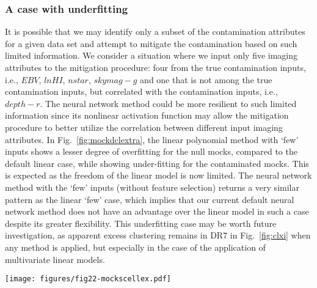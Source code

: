 \subsubsection{A case with underfitting}
It is possible that we may identify only a subset of the contamination attributes for a given data set and attempt to mitigate the contamination based on such limited information. We consider a situation where we input only five imaging attributes to the mitigation procedure: four from the true contamination inputs, i.e., $EBV$, $lnHI$, $nstar$, $skymag-g$ and one that is not among the true contamination inputs, but correlated with the contamination inputs, i.e., $depth-r$. The neural network method could be more resilient to such limited information since its nonlinear activation function may allow the mitigation procedure to better utilize the correlation between different input imaging attributes. In Fig.~\ref{fig:mockdclextra}, the linear polynomial method with `few' inputs shows a lesser degree of overfitting for the null mocks, compared to the default linear case, while showing under-fitting for the contaminated mocks. This is expected as the freedom of the linear model is now limited.  The neural network method with the `few' inputs (without feature selection) returns a very similar pattern as the linear `few' case, which implies that our current default neural network method does not have an advantage over the linear model in such a case despite its greater flexibility. This underfitting case may be worth future investigation, as apparent excess clustering remains in DR7 in Fig.~\ref{fig:clxi} when any method is applied, but especially in the case of the application of multivariate linear models.

\begin{figure*}
\centering
\texttt{[image: figures/fig22-mockscellex.pdf]}
\caption{Same as Fig. \ref{fig:deltaclmock} showing the mean auto power spectrum of the 100 null (left) and contaminated (right) mocks mitigated with the fewer imaging maps `few' (to demonstrate under-correction), neural network without the feature selection `plain', and the ground truth contamination model `truth'. The mitigation with the ground truth model achieves the lowest residual bias as expected. For the null mocks, using fewer imaging maps prevents over-fitting simply by providing less freedom in the regression model while it leads to underfitting for the contaminated mocks. }
\label{fig:mockdclextra}
\end{figure*}


